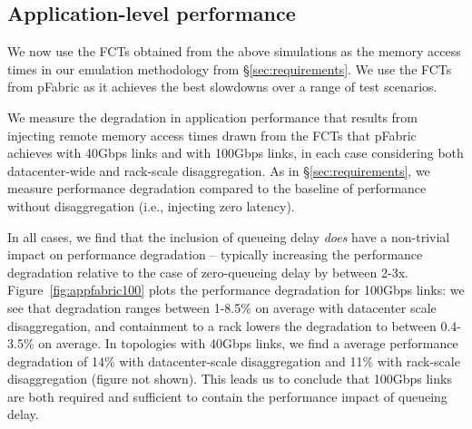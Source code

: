 
\vspace{-0.1in}
\subsection{Application-level performance}
\label{ssec:alp}
\vspace{-0.05in}
We now use the FCTs obtained from the above simulations as the memory access times in our emulation methodology from \S\ref{sec:requirements}. We use the FCTs from pFabric as it achieves the best slowdowns over a range of test scenarios. 

We measure the degradation in application performance that results from injecting remote memory access times drawn from the FCTs that pFabric achieves with 40Gbps links and with 100Gbps links, in each case considering both datacenter-wide and rack-scale disaggregation. As in \S\ref{sec:requirements}, we measure performance degradation compared to the baseline of performance without disaggregation (i.e., injecting zero latency). 

In all cases, we find that the inclusion of queueing delay \emph{does} have a non-trivial impact on performance degradation -- typically increasing the performance degradation relative to the case of zero-queueing delay by between 2-3x. 
Figure~\ref{fig:appfabric100} plots the performance degradation for 100Gbps links: we see that degradation ranges between 1-8.5\% on average with datacenter scale disaggregation, and containment to a rack lowers the degradation to between 0.4-3.5\% on average. In topologies with 40Gbps links, we find a average performance degradation of 14\% with datacenter-scale disaggregation and 11\% with rack-scale disaggregation (figure not shown). 
This leads us to conclude that 100Gbps links are both required and sufficient to contain the performance impact of queueing delay.

